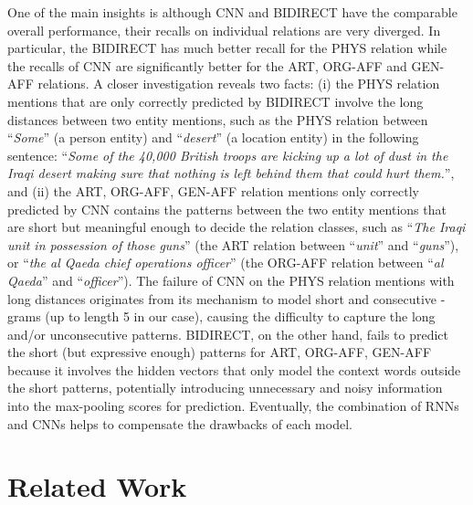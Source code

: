 \documentclass[11pt,letterpaper]{article}
\begin{document}
One of the main insights is although CNN and BIDIRECT have the comparable overall performance, their recalls on individual relations are very diverged. In particular, the BIDIRECT has much better recall for the PHYS relation while the recalls of CNN are significantly better for the ART, ORG-AFF and GEN-AFF relations. A closer investigation reveals two facts: (i) the PHYS relation mentions that are only correctly predicted by BIDIRECT involve the long distances between two entity mentions, such as the PHYS relation between ``{\it Some}'' (a person entity) and ``{\it desert}'' (a location entity) in the following sentence: ``{\it Some of the 40,000 British troops are kicking up a lot of dust in the Iraqi desert making sure that nothing is left behind them that could hurt them.}'', and (ii) the ART, ORG-AFF, GEN-AFF relation mentions only correctly predicted by CNN contains the patterns between the two entity mentions that are short but meaningful enough to decide the relation classes, such as ``{\it The Iraqi unit in possession of those guns}'' (the ART relation between ``{\it unit}'' and ``{\it guns}''), or ``{\it the al Qaeda chief operations officer}'' (the ORG-AFF relation between ``{\it al Qaeda}'' and ``{\it officer}''). The failure of CNN on the PHYS relation mentions with long distances originates from its mechanism to model short and consecutive -grams (up to length 5 in our case), causing the difficulty to capture the long and/or unconsecutive patterns. BIDIRECT, on the other hand, fails to predict the short (but expressive enough) patterns for ART, ORG-AFF, GEN-AFF because it involves the hidden vectors that only model the context words outside the short patterns, potentially introducing unnecessary and noisy information into the max-pooling scores for prediction. Eventually, the combination of RNNs and CNNs helps to compensate the drawbacks of each model.
























\section{Related Work}
\end{document}
